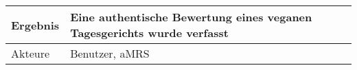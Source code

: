 \begin{table}[H]
\begin{tabularx}{\textwidth}{| l | X |}
        \hline
        Ergebnis           & Eine authentische Bewertung eines veganen Tagesgerichts wurde verfasst                                                                                                                                                                                                                                                                                                                                                                                                                                                                                                                                              \\
        \hline
        Akteure            & Benutzer, \ac{aMRS}                                                                                                                                                                                                                                                                                                                                                                                                                                                                                                                                                                                                 \\
        \hline
    \end{tabularx}
\end{table}



